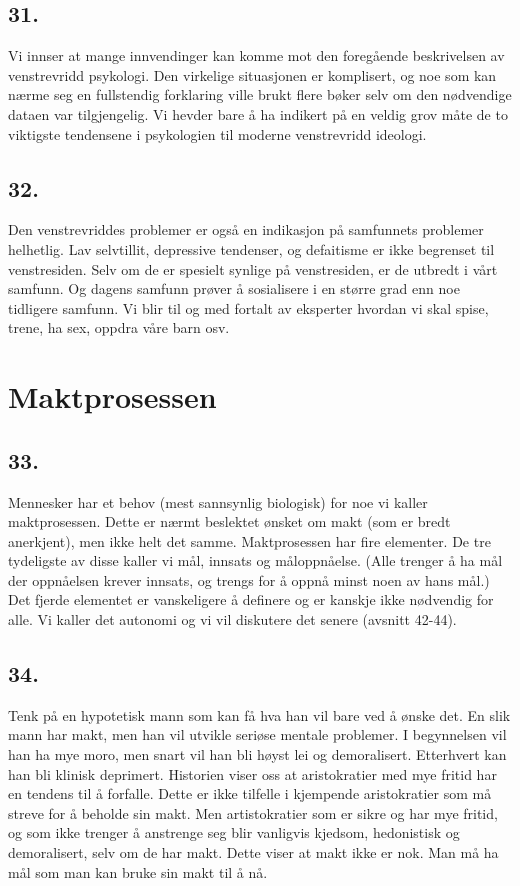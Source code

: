 \documentclass[oneside]{book}
\begin{document}
\section*{31.}
Vi innser at mange innvendinger kan komme mot den foregående beskrivelsen av venstrevridd psykologi. Den virkelige situasjonen er komplisert, og noe som kan nærme seg en fullstendig forklaring ville brukt flere bøker selv om den nødvendige dataen var tilgjengelig. Vi hevder bare å ha indikert på en veldig grov måte de to viktigste tendensene i psykologien til moderne venstrevridd ideologi.

\section*{32.}
Den venstrevriddes problemer er også en indikasjon på samfunnets problemer helhetlig. Lav selvtillit, depressive tendenser, og defaitisme er ikke begrenset til venstresiden. Selv om de er spesielt synlige på venstresiden, er de utbredt i vårt samfunn. Og dagens samfunn prøver å sosialisere i en større grad enn noe tidligere samfunn. Vi blir til og med fortalt av eksperter hvordan vi skal spise, trene, ha sex, oppdra våre barn osv.

\chapter{Maktprosessen}
\section*{33.}
Mennesker har et behov (mest sannsynlig biologisk) for noe vi kaller maktprosessen. Dette er nærmt beslektet ønsket om makt (som er bredt anerkjent), men ikke helt det samme. Maktprosessen har fire elementer. De tre tydeligste av disse kaller vi mål, innsats og måloppnåelse. (Alle trenger å ha mål der oppnåelsen krever innsats, og trengs for å oppnå minst noen av hans mål.) Det fjerde elementet er vanskeligere å definere og er kanskje ikke nødvendig for alle. Vi kaller det autonomi og vi vil diskutere det senere (avsnitt 42-44).

\section*{34.}
Tenk på en hypotetisk mann som kan få hva han vil bare ved å ønske det. En slik mann har makt, men han vil utvikle seriøse mentale problemer. I begynnelsen vil han ha mye moro, men snart vil han bli høyst lei og demoralisert. Etterhvert kan han bli klinisk deprimert. Historien viser oss at aristokratier med mye fritid har en tendens til å forfalle. Dette er ikke tilfelle i kjempende aristokratier som må streve for å beholde sin makt. Men artistokratier som er sikre og har mye fritid, og som ikke trenger å anstrenge seg blir vanligvis kjedsom, hedonistisk og demoralisert, selv om de har makt. Dette viser at makt ikke er nok. Man må ha mål som man kan bruke sin makt til å nå.
\end{document}
